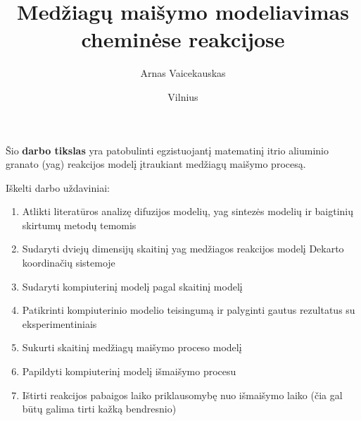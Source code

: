 \documentclass{VUMIFInfKursinis}
\institute{Informatikos institutas}  %
\title{Medžiagų maišymo modeliavimas cheminėse
reakcijose}
\author{Arnas Vaicekauskas}
\date{Vilnius \\ \the\year}
\begin{document}
\maketitle

\tableofcontents




%
%
%

Šio \textbf{darbo tikslas} yra patobulinti egzistuojantį matematinį itrio aliuminio granato (\acs{yag}) reakcijos modelį 
\cite{ivanauskasModellingSolidState2005} įtraukiant medžiagų maišymo procesą.

Iškelti darbo uždaviniai:

\begin{enumerate}
\item  Atlikti literatūros analizę difuzijos modelių, \acs{yag} sintezės modelių ir baigtinių skirtumų metodų temomis 
\item Sudaryti dviejų dimensijų skaitinį \ac{yag} medžiagos reakcijos modelį Dekarto koordinačių sistemoje
\item Sudaryti kompiuterinį modelį pagal skaitinį modelį
\item Patikrinti kompiuterinio modelio teisingumą ir palyginti gautus rezultatus su eksperimentiniais
\item Sukurti skaitinį medžiagų maišymo proceso modelį 
\item Papildyti kompiuterinį modelį išmaišymo procesu
\item Ištirti reakcijos pabaigos laiko priklausomybę nuo išmaišymo laiko (čia gal būtų galima tirti kažką bendresnio)
\end{enumerate}

\end{document}
